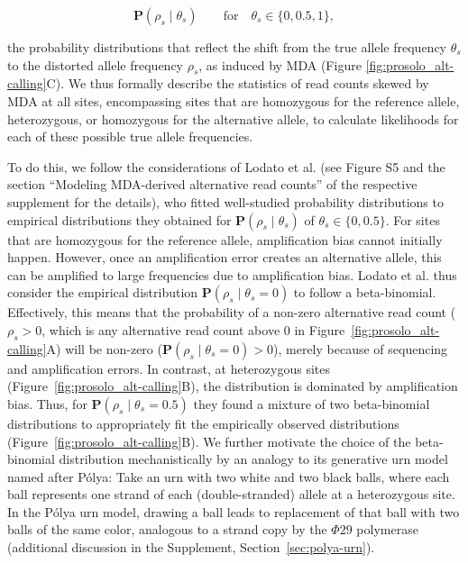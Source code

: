 \documentclass[12pt,inline]{wlscirep}
\begin{document}
\begin{equation}
 \mathbf{P}(\rho_s\mid\theta_s)\qquad \text{for}  \quad\theta_s\in\{0,0.5,1\},
\end{equation}

the probability distributions that reflect the shift from the true allele frequency $\theta_s$ to the distorted allele frequency $\rho_s$, as induced by MDA (Figure \ref{fig:prosolo_alt-calling}C).
We thus formally describe the statistics of read counts skewed by MDA at all sites, encompassing sites that are homozygous for the reference allele, heterozygous, or homozygous for the alternative allele, to calculate likelihoods for each of these possible true allele frequencies.

To do this, we follow the considerations of Lodato et al.\cite{lodato_somatic_2015} (see Figure S5 and the section ``Modeling MDA-derived alternative read counts'' of the respective supplement for the details), who fitted well-studied probability distributions to empirical distributions they obtained for $\mathbf{P}(\rho_s\mid\theta_s)$ of $\theta_s\in\{0,0.5\}$.
For sites that are homozygous for the reference allele, amplification bias cannot initially happen.
However, once an amplification error creates an alternative allele, this can be amplified to large frequencies due to amplification bias.
Lodato et al.\cite{lodato_somatic_2015} thus consider the empirical distribution $\mathbf{P}(\rho_s\mid\theta_s=0)$ to follow a beta-binomial.
Effectively, this means that the probability of a non-zero alternative read count  ($\rho_s>0$, which is any alternative read count above $0$ in Figure~\ref{fig:prosolo_alt-calling}A) will be non-zero ($\mathbf{P}(\rho_s\mid\theta_s=0)>0$), merely because of sequencing and amplification errors.
In contrast, at heterozygous sites (Figure~\ref{fig:prosolo_alt-calling}B), the distribution is dominated by amplification bias.
Thus, for $\mathbf{P}(\rho_s\mid\theta_s=0.5)$ they found a mixture of two beta-binomial distributions to appropriately fit the empirically observed distributions (Figure~\ref{fig:prosolo_alt-calling}B).
We further motivate the choice of the beta-binomial distribution mechanistically by an analogy to its generative urn model named after Pólya\cite{eggenberger_uber_1923}:
Take an urn with two white and two black balls, where each ball represents one strand of each (double-stranded) allele at a heterozygous site.
In the Pólya urn model, drawing a ball leads to replacement of that ball with two balls of the same color, analogous to a strand copy by the $\Phi29$ polymerase (additional discussion in the Supplement, Section~\ref{sec:polya-urn}).
\end{document}
